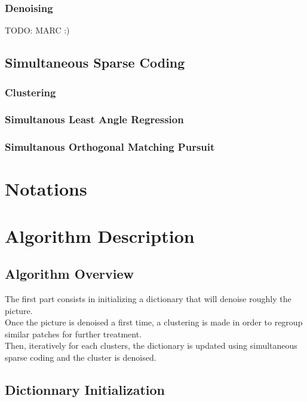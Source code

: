 \documentclass{ipol}
\begin{document}
\subsubsection{Denoising}
TODO: MARC :)

\subsection{Simultaneous Sparse Coding}

\subsubsection{Clustering}

\subsubsection{Simultanous Least Angle Regression}

\subsubsection{Simultanous Orthogonal Matching Pursuit}

\section{Notations}

\section{Algorithm Description}

\subsection{ Algorithm Overview }

The first part consists in initializing a dictionary that will denoise roughly the picture.\\
Once the picture is denoised a first time, a clustering is made in order to regroup similar patches for further treatment.\\
Then, iteratively for each clusters, the dictionary is updated using simultaneous sparse coding and the cluster is denoised.

\subsection{Dictionnary Initialization}
\end{document}
